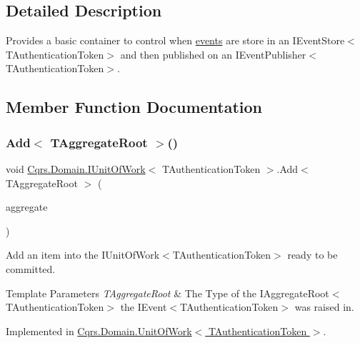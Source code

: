 \subsection{Detailed Description}
Provides a basic container to control when \hyperlink{}{events} are store in an I\+Event\+Store$<$\+T\+Authentication\+Token$>$ and then published on an I\+Event\+Publisher$<$\+T\+Authentication\+Token$>$. 



\subsection{Member Function Documentation}
\mbox{\label{interfaceCqrs_1_1Domain_1_1IUnitOfWork_a786ebca85b4ef7294b98280230ef1397_a786ebca85b4ef7294b98280230ef1397}} 
\subsubsection{\texorpdfstring{Add$<$ T\+Aggregate\+Root $>$()}{Add< TAggregateRoot >()}}
{\footnotesize\ttfamily void \hyperlink{interfaceCqrs_1_1Domain_1_1IUnitOfWork}{Cqrs.\+Domain.\+I\+Unit\+Of\+Work}$<$ T\+Authentication\+Token $>$.Add$<$ T\+Aggregate\+Root $>$ (\begin{DoxyParamCaption}\item[{T\+Aggregate\+Root}]{aggregate }\end{DoxyParamCaption})}



Add an item into the I\+Unit\+Of\+Work$<$\+T\+Authentication\+Token$>$ ready to be committed. 


\begin{DoxyTemplParams}{Template Parameters}
{\em T\+Aggregate\+Root} & The Type of the I\+Aggregate\+Root$<$\+T\+Authentication\+Token$>$ the I\+Event$<$\+T\+Authentication\+Token$>$ was raised in.\\
\hline
\end{DoxyTemplParams}


Implemented in \hyperlink{classCqrs_1_1Domain_1_1UnitOfWork_a840214f97d3661c7b5a739df65fadc9f_a840214f97d3661c7b5a739df65fadc9f}{Cqrs.\+Domain.\+Unit\+Of\+Work$<$ T\+Authentication\+Token $>$}.

